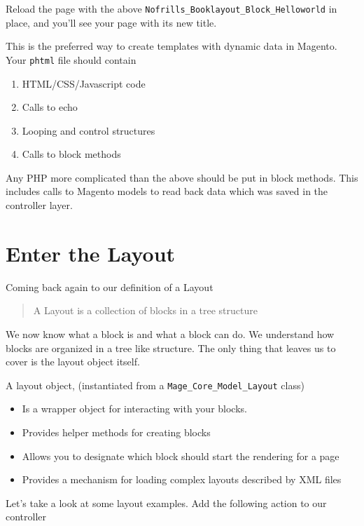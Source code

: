 \documentclass[oneside]{book}
\begin{document}
Reload the page with the above \footnotesize\texttt{Nofrills\_Booklayout\_Block\_Helloworld} \normalsize  in place, and you'll see your page with its new title.

This is the preferred way to create templates with dynamic data in Magento.  Your \footnotesize\texttt{phtml} \normalsize  file should contain

\begin{enumerate}
\item HTML/CSS/Javascript code
\item Calls to echo
\item Looping and control structures
\item Calls to block methods
\end{enumerate}


Any PHP more complicated than the above should be put in block methods. This includes calls to Magento models to read back data which was saved in the controller layer.  

\section{Enter the Layout}

Coming back again to our definition of a Layout

\begin{quote}
A Layout is a collection of blocks in a tree structure
\end{quote}

We now know what a block is and what a block can do.  We understand how blocks are organized in a tree like structure.  The only thing that leaves us to cover is the layout object itself.  

A layout object, (instantiated from a \footnotesize\texttt{Mage\_Core\_Model\_Layout} \normalsize  class)  

\begin{itemize}
\item Is a wrapper object for interacting with your blocks.  
\item Provides helper methods for creating blocks
\item Allows you to designate which block should start the rendering for a page
\item Provides a mechanism for loading complex layouts described by XML files
\end{itemize}


Let's take a look at some layout examples.  Add the following action to our controller 
\end{document}
